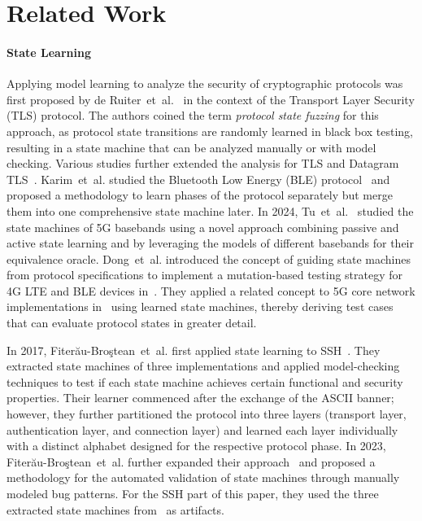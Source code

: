 \section{Related Work}

\paragraph{State Learning}

Applying model learning to analyze the security of cryptographic protocols was first proposed by de Ruiter~et~al.~\cite{USENIX:dRuPol15} in the context of the Transport Layer Security (TLS) protocol. The authors coined the term \emph{protocol state fuzzing} for this approach, as protocol state transitions are randomly learned in black box testing, resulting in a state machine that can be analyzed manually or with model checking. Various studies further extended the analysis for TLS and Datagram TLS~\cite{SecITSys:dRu16,yadav2018tls,USENIX:FJMRSS20,CCS:STVHBC22,ESORICS:RasLevDeb22}. Karim~et~al. studied the Bluetooth Low Energy (BLE) protocol~\cite{SP:KIHB23} and proposed a methodology to learn phases of the protocol separately but merge them into one comprehensive state machine later. In 2024, Tu~et~al.~\cite{USENIX:TIRDWW24} studied the state machines of 5G basebands using a novel approach combining passive and active state learning and by leveraging the models of different basebands for their equivalence oracle. Dong~et~al. introduced the concept of guiding state machines from protocol specifications to implement a mutation-based testing strategy for 4G LTE and BLE devices in~\cite{CCS:RWTITD24}. They applied a related concept to 5G core network implementations in~\cite{dong2025corecrisis} using learned state machines, thereby deriving test cases that can evaluate protocol states in greater detail.

In 2017, Fiter\u{a}u-Bro\c{s}tean~et~al. first applied state learning to SSH~\cite{SPIN:fiterauSshModelChecking}. They extracted state machines of three implementations and applied model-checking techniques to test if each state machine achieves certain functional and security properties. Their learner commenced after the exchange of the ASCII banner; however, they further partitioned the protocol into three layers (transport layer, authentication layer, and connection layer) and learned each layer individually with a distinct alphabet designed for the respective protocol phase. In 2023, Fiter\u{a}u-Bro\c{s}tean~et~al. further expanded their approach~\cite{NDSS:FJST23} and proposed a methodology for the automated validation of state machines through manually modeled bug patterns. For the SSH part of this paper, they used the three extracted state machines from~\cite{SPIN:fiterauSshModelChecking} as artifacts.

